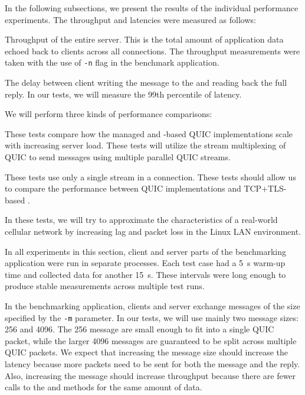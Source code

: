 In the following subsections, we present the results of the individual performance experiments. The
throughput and latencies were measured as follows:

\begin{itemize}

   Throughput of the entire server. This is the total amount of application data
echoed back to clients across all connections. The throughput measurements were taken with the use
of \texttt{-n} flag in the benchmark application.

   The delay between client writing the message to the \Stream{} and reading back the
full reply. In our tests, we will measure the 99th percentile of latency.

\end{itemize}

We will perform three kinds of performance comparisons:

\begin{itemize}

         These tests compare how the managed and
\libmsquic{}-based QUIC implementations scale with increasing server load. These tests will utilize
the stream multiplexing of QUIC to send messages using multiple parallel QUIC streams.

         These tests use only a single stream in a connection.
These tests should allow us to compare the performance between QUIC implementations and
TCP+TLS-based \SslStream{}.

         In these tests, we will try to approximate
the characteristics of a real-world cellular network by increasing lag and packet loss in the Linux
LAN environment.

\end{itemize}

In all experiments in this section, client and server parts of the benchmarking application were run
in separate processes. Each test case had a \SI{5}{\second} warm-up time and collected data for
another \SI{15}{\second}. These intervals were long enough to produce stable measurements across
multiple test runs.

In the benchmarking application, clients and server exchange messages of the size specified by the
\texttt{-m} parameter. In our tests, we will use mainly two message sizes: \SI{256}{\byte} and
\SI{4096}{\byte}. The \SI{256}{\byte} message are small enough to fit into a single QUIC packet,
while the larger \SI{4096}{\byte} messages are guaranteed to be split across multiple QUIC packets.
We expect that increasing the message size should increase the latency because more packets need to
be sent for both the message and the reply. Also, increasing the message should increase throughput
because there are fewer calls to the  and  methods for the same
amount of data.

